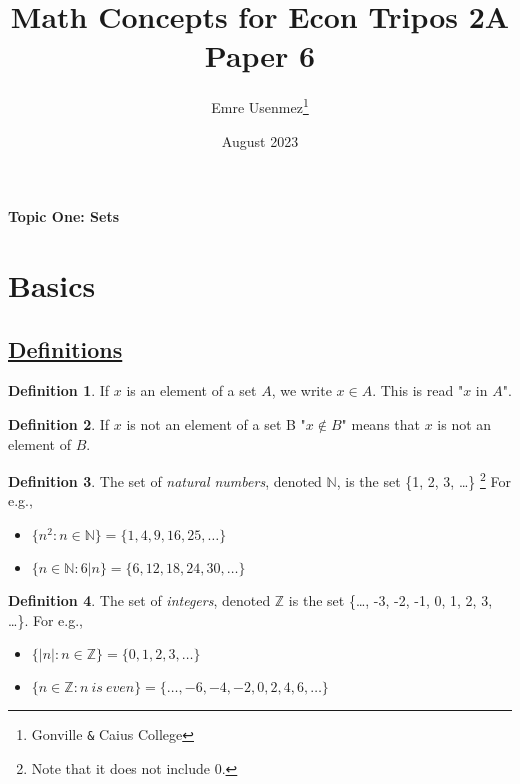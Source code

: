 \documentclass{amsart} %
\title{Math Concepts for Econ Tripos 2A Paper 6}
\author{Emre Usenmez\thanks{Gonville \verb|&| Caius College}}
\date{August 2023}
\theoremstyle{definition} %
\newtheorem*{dfn}{Definition} %
\theoremstyle{proposition} %
\theoremstyle{remark} %
\begin{document}


\begin{center}
      \textbf{Topic One: Sets}
\end{center}



\section{\textbf{Basics}}
\subsection{\underline{Definitions}}

\begin{dfn}
\boxed{\in} \quad If $x$ is an element of a set $A$, we write $x \in A$. This is read "$x$ in $A$". %
\end{dfn}

\begin{dfn}
\boxed{\not\in} \quad If $x$ is not an element of a set B "$x \not\in B$" means that $x$ is not an element of $B$.
\end{dfn}

\begin{dfn}
 \quad The set of \emph{natural numbers}, denoted $\mathbb{N}$, is the set \{1, 2, 3, \dots\} \footnote{Note that it does not include 0.} For e.g.,
    \begin{itemize}
          \item $\{n^2:n \in \mathbb{N} \} = \{1, 4, 9, 16, 25, \dots\}$
          \item $\{n \in \mathbb{N} : 6|n\} = \{6, 12, 18, 24, 30, \dots\}$
    \end{itemize}
\end{dfn}

\begin{dfn}
 \quad The set of \emph{integers}, denoted $\mathbb{Z}$ is the set \{\dots, -3, -2, -1, 0, 1, 2, 3, \dots \}. For e.g.,
    \begin{itemize}
          \item $\{|n|:n \in \mathbb{Z} \} = \{0, 1, 2, 3, \dots\}$
          \item $\{n \in \mathbb{Z}: n\ is\ even\} = \{\dots, -6, -4, -2, 0, 2, 4, 6, \dots \}$ %
    \end{itemize}
\end{dfn}
\end{document}
